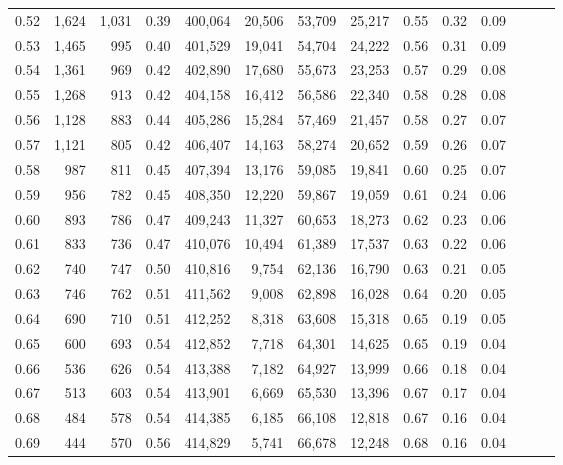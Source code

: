 \begin{tabular}{rrrrrrrrrrrrrr}
0.52 &   1,624 &  1,031 &  0.39 &  400,064 &   20,506 &  53,709 &  25,217 &  0.55 &  0.32 &      0.09 \\
0.53 &   1,465 &    995 &  0.40 &  401,529 &   19,041 &  54,704 &  24,222 &  0.56 &  0.31 &      0.09 \\
0.54 &   1,361 &    969 &  0.42 &  402,890 &   17,680 &  55,673 &  23,253 &  0.57 &  0.29 &      0.08 \\
0.55 &   1,268 &    913 &  0.42 &  404,158 &   16,412 &  56,586 &  22,340 &  0.58 &  0.28 &      0.08 \\
0.56 &   1,128 &    883 &  0.44 &  405,286 &   15,284 &  57,469 &  21,457 &  0.58 &  0.27 &      0.07 \\
0.57 &   1,121 &    805 &  0.42 &  406,407 &   14,163 &  58,274 &  20,652 &  0.59 &  0.26 &      0.07 \\
0.58 &     987 &    811 &  0.45 &  407,394 &   13,176 &  59,085 &  19,841 &  0.60 &  0.25 &      0.07 \\
0.59 &     956 &    782 &  0.45 &  408,350 &   12,220 &  59,867 &  19,059 &  0.61 &  0.24 &      0.06 \\
0.60 &     893 &    786 &  0.47 &  409,243 &   11,327 &  60,653 &  18,273 &  0.62 &  0.23 &      0.06 \\
0.61 &     833 &    736 &  0.47 &  410,076 &   10,494 &  61,389 &  17,537 &  0.63 &  0.22 &      0.06 \\
0.62 &     740 &    747 &  0.50 &  410,816 &    9,754 &  62,136 &  16,790 &  0.63 &  0.21 &      0.05 \\
0.63 &     746 &    762 &  0.51 &  411,562 &    9,008 &  62,898 &  16,028 &  0.64 &  0.20 &      0.05 \\
0.64 &     690 &    710 &  0.51 &  412,252 &    8,318 &  63,608 &  15,318 &  0.65 &  0.19 &      0.05 \\
0.65 &     600 &    693 &  0.54 &  412,852 &    7,718 &  64,301 &  14,625 &  0.65 &  0.19 &      0.04 \\
0.66 &     536 &    626 &  0.54 &  413,388 &    7,182 &  64,927 &  13,999 &  0.66 &  0.18 &      0.04 \\
0.67 &     513 &    603 &  0.54 &  413,901 &    6,669 &  65,530 &  13,396 &  0.67 &  0.17 &      0.04 \\
0.68 &     484 &    578 &  0.54 &  414,385 &    6,185 &  66,108 &  12,818 &  0.67 &  0.16 &      0.04 \\
0.69 &     444 &    570 &  0.56 &  414,829 &    5,741 &  66,678 &  12,248 &  0.68 &  0.16 &      0.04 \\

\end{tabular}
